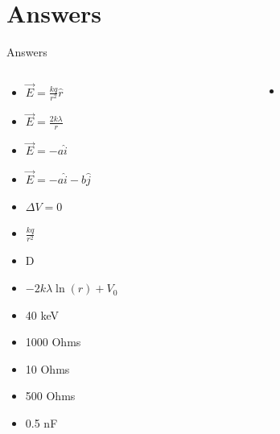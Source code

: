 \documentclass{beamer}
\begin{document}
\section{Answers}

\begin{frame}{Answers}
\tiny
\begin{columns}[T]
\begin{column}{0.5\textwidth}
\begin{itemize}
\item $\vec{E} = \frac{kq}{r^2}\hat{r}$
\item $\vec{E} = \frac{2k\lambda}{r}$
\item $\vec{E} = -a\hat{i}$
\item $\vec{E} = -a\hat{i}-b\hat{j}$
\item $\Delta V = 0$
\item $\frac{kq}{r^2}$
\item D
\item $-2k\lambda\ln(r) + V_0$
\item 40 keV
\item 1000 Ohms
\item 10 Ohms
\item 500 Ohms
\item 0.5 nF
\end{itemize}
\end{column}
\begin{column}{0.5\textwidth}
\begin{itemize}
\item 
\end{itemize}
\end{column}
\end{columns}
\end{frame}
\end{document}
